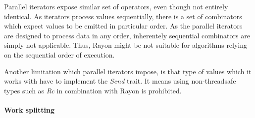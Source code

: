 Parallel iterators expose similar set of operators, even though not entirely identical. As iterators process values sequentially, there is a set of combinators which expect values to be emitted in particular order. As the parallel iterators are designed to process data in any order, inherentely sequential combinators are simply not applicable. Thus, Rayon might be not suitable for algorithms relying on the sequential order of execution.

Another limitation which parallel iterators impose, is that type of values which it works with have to implement the \emph{Send} trait. It means using non-threadsafe types such as \emph{Rc} in combination with Rayon is prohibited. 

\paragraph*{Work splitting}
